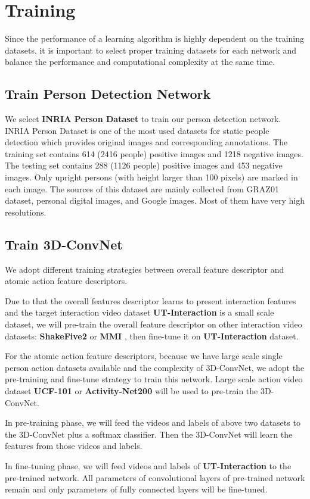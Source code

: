 \section{Training}
\label{3_4}
Since the performance of a learning algorithm is highly dependent on the training datasets, it is important to select proper training datasets for each network and balance the performance and computational complexity at the same time.
  
\subsection{Train Person Detection Network}
We select \textbf{INRIA Person Dataset} \cite{inria_person} to train our person detection network. INRIA Person Dataset is one of the most used datasets for static people detection which provides original images and corresponding annotations. The training set contains 614 (2416 people) positive images and 1218 negative images. The testing set contains 288 (1126 people) positive images and 453 negative images. Only upright persons (with height larger than 100 pixels) are marked in each image. The sources of this dataset are mainly collected from GRAZ01 dataset, personal digital images, and Google images. Most of them have very high resolutions.

\subsection{Train 3D-ConvNet}
We adopt different training strategies between overall feature descriptor and atomic action feature descriptors. 
\par
Due to that the overall features descriptor learns to present interaction features and the target interaction video dataset \textbf{UT-Interaction} \cite{ut2010} is a small scale dataset, we will pre-train the overall feature descriptor on other interaction video datasets: \textbf{ShakeFive2} \cite{shakefive2} or \textbf{MMI} \cite{m2i_tju}, then fine-tune it on \textbf{UT-Interaction} dataset.
\par
For the atomic action feature descriptors, because we have large scale single person action datasets available and the complexity of 3D-ConvNet, we adopt the pre-training and fine-tune strategy to train this network. Large scale action video dataset \textbf{UCF-101} \cite{ucf101} or \textbf{Activity-Net200} \cite{activitynet200} will be used to pre-train the 3D-ConvNet.
\par 
In pre-training phase, we will feed the videos and labels of above two datasets to the 3D-ConvNet plus a softmax classifier. Then the 3D-ConvNet will learn the features from those videos and labels. 
\par 
In fine-tuning phase, we will feed videos and labels of \textbf{UT-Interaction} to the pre-trained network. All parameters of convolutional layers of pre-trained network remain and only parameters of fully connected layers will be fine-tuned. 

